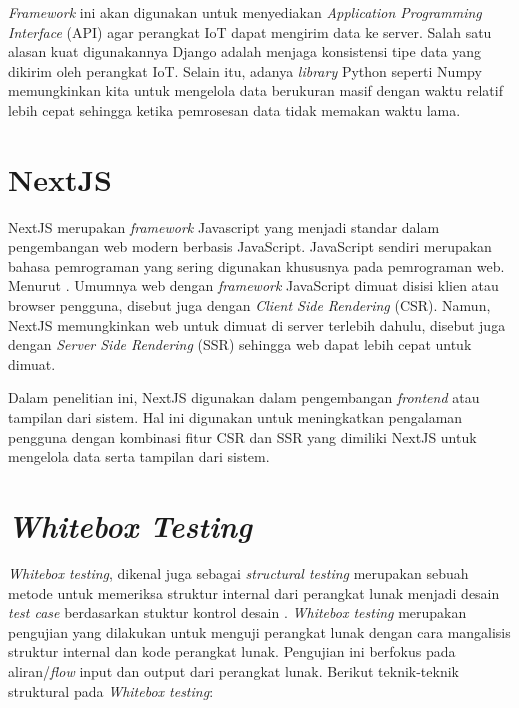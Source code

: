 \textit{Framework} ini akan digunakan untuk menyediakan \textit{Application Programming Interface} (API) agar perangkat IoT dapat mengirim data ke server. Salah satu alasan kuat digunakannya Django adalah menjaga konsistensi tipe data yang dikirim oleh perangkat IoT. Selain itu, adanya \textit{library} Python seperti Numpy memungkinkan kita untuk mengelola data berukuran masif dengan waktu relatif lebih cepat sehingga ketika pemrosesan data tidak memakan waktu lama.

\section{NextJS}

NextJS merupakan \textit{framework} Javascript yang menjadi standar dalam pengembangan web modern berbasis JavaScript. JavaScript sendiri merupakan bahasa pemrograman yang sering digunakan khususnya pada pemrograman web. Menurut \textcite{article:tomasdottir}. Umumnya web dengan \textit{framework} JavaScript dimuat disisi klien atau browser pengguna, disebut juga dengan \textit{Client Side Rendering}  (CSR). Namun, NextJS memungkinkan web untuk dimuat di server terlebih dahulu, disebut juga dengan \textit{Server Side Rendering} (SSR) sehingga web dapat lebih cepat untuk dimuat.

Dalam penelitian ini, NextJS digunakan dalam pengembangan \textit{frontend} atau tampilan dari sistem. Hal ini digunakan untuk meningkatkan pengalaman pengguna dengan kombinasi fitur CSR dan SSR yang dimiliki NextJS untuk mengelola data serta tampilan dari sistem.

\section{\textit{Whitebox Testing}}

\textit{Whitebox testing}, dikenal juga sebagai \textit{structural testing} merupakan sebuah metode untuk memeriksa struktur internal dari perangkat lunak menjadi desain \textit{test case} berdasarkan stuktur kontrol desain \parencite{article:nidhra}. \textit{Whitebox testing} merupakan pengujian yang dilakukan untuk menguji perangkat lunak dengan cara mangalisis struktur internal dan kode perangkat lunak. Pengujian ini berfokus pada aliran/\textit{flow} input dan output dari perangkat lunak. Berikut teknik-teknik struktural pada \textit{Whitebox testing}:

